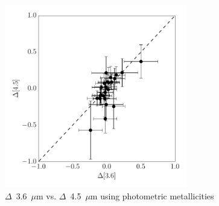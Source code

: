 \documentclass[a4paper,fleqn,usenatbib]{mnras}
\begin{document}
\begin{figure}
\begin{center}
\includegraphics[width=80mm]{final_plots/deltadelta_3p6_4p5_phot.pdf}
\caption{$\Delta$~3.6~$\mu$m vs. $\Delta$~4.5~$\mu$m using photometric metallicities}
\label{fig:deltadelta_phot}
\end{center}
\end{figure}





\bsp	%
\label{lastpage}
\end{document}
